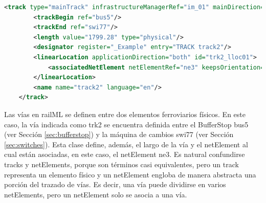     \begin{lstlisting}[language = XML, caption = Clase track , label = {lst:track}]
    <track type="mainTrack" infrastructureManagerRef="im_01" mainDirection="both" id="trk2">
        <trackBegin ref="bus5"/>
        <trackEnd ref="swi77"/>
        <length value="1799.28" type="physical"/>
        <designator register="_Example" entry="TRACK track2"/>
        <linearLocation applicationDirection="both" id="trk2_lloc01">
            <associatedNetElement netElementRef="ne3" keepsOrientation="true"/>
        </linearLocation>
        <name name="track2" language="en"/>
    </track>
    \end{lstlisting}
    
    Las vías en railML se definen entre dos elementos ferroviarios físicos. En este caso, la vía indicada como trk2 se encuentra definida entre el BufferStop bus5 (ver Sección \ref{sec:bufferstop}) y la máquina de cambios swi77 (ver Sección \ref{sec:switches}). Esta clase define, además, el largo de la vía y el netElement al cual están asociadas, en este caso, el netElement ne3. Es natural confundirse tracks y netElements, porque son términos casi equivalentes, pero un track representa un elemento físico y un netElement engloba de manera abstracta una porción del trazado de vías. Es decir, una vía puede dividirse en varios netElements, pero un netElement solo se asocia a una vía.